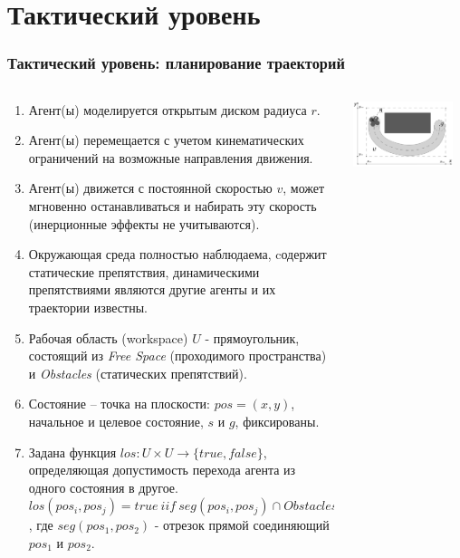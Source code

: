 \documentclass[default]{beamer}
\begin{document}
	\section{Тактический уровень}
	
	\begin{frame}
		\frametitle{Тактический уровень: планирование траекторий}
		\tiny
		\begin{columns}
			\begin{column}{0.5\textwidth}
				\begin{enumerate}
					\item Агент(ы) моделируется открытым диском радиуса $r$.
					\item Агент(ы) перемещается с учетом кинематических ограничений на возможные направления движения.
					\item Агент(ы) движется с постоянной скоростью $v$, может мгновенно останавливаться и набирать эту скорость (инерционные эффекты не учитываются).
					\item Окружающая среда полностью наблюдаема, cодержит статические препятствия, динамическими препятствиями являются другие агенты и их траектории известны.
					\item Рабочая область (workspace) $U$ - прямоугольник, состоящий из \textit{Free Space} (проходимого пространства) и \textit{Obstacles} (статических препятствий).
					\item Состояние – точка на плоскости: $pos=(x, y)$, начальное и целевое состояние, $s$ и $g$, фиксированы.
					\item Задана функция $los: U \times U \rightarrow \{true, false\}$, определяющая допустимость перехода агента из одного состояния в другое. $los(pos_i, pos_j) = true\ iif\ seg(pos_i, pos_j) \cap Obstacles = \varnothing$, где $seg(pos_1, pos_2)$ - отрезок прямой соединяющий $pos_1$ и $pos_2$.
				\end{enumerate}
			\end{column}
			\begin{column}{0.5\textwidth}
				\includegraphics[width=0.9\textwidth]{pathtask.png}

\end{column}
\end{columns}
\end{frame}
\end{document}
